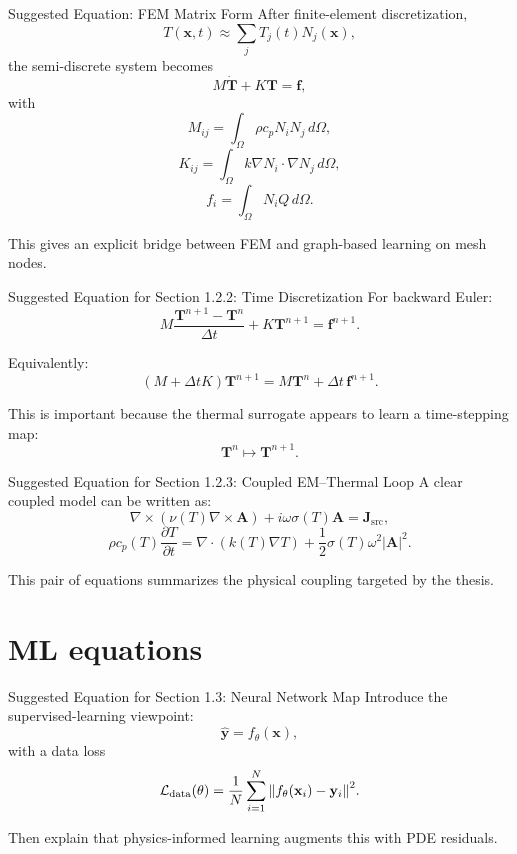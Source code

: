 \documentclass[aspectratio=169]{beamer}
\begin{document}
\begin{frame}{Suggested Equation: FEM Matrix Form}
After finite-element discretization,
\[
T(\mathbf{x},t)\approx \sum_j T_j(t)N_j(\mathbf{x}),
\]
the semi-discrete system becomes
\[
M \dot{\mathbf{T}} + K\mathbf{T}=\mathbf{f},
\]
with
\[
M_{ij}=\int_\Omega \rho c_p N_iN_j\,d\Omega,
\]
\[
K_{ij}=\int_\Omega k\nabla N_i\cdot\nabla N_j\,d\Omega,
\]
\[
f_i=\int_\Omega N_i Q\,d\Omega.
\]

This gives an explicit bridge between FEM and graph-based learning on mesh nodes.
\end{frame}

\begin{frame}{Suggested Equation for Section 1.2.2: Time Discretization}
For backward Euler:
\[
M\frac{\mathbf{T}^{n+1}-\mathbf{T}^{n}}{\Delta t}
+
K\mathbf{T}^{n+1}
=
\mathbf{f}^{n+1}.
\]

Equivalently:
\[
\left(M+\Delta t K\right)\mathbf{T}^{n+1}
=
M\mathbf{T}^{n}
+
\Delta t\,\mathbf{f}^{n+1}.
\]

This is important because the thermal surrogate appears to learn a time-stepping map:
\[
\mathbf{T}^{n}\mapsto \mathbf{T}^{n+1}.
\]
\end{frame}

\begin{frame}{Suggested Equation for Section 1.2.3: Coupled EM--Thermal Loop}
A clear coupled model can be written as:
\[
\nabla\times\left(\nu(T)\nabla\times \mathbf{A}\right)
+
i\omega\sigma(T)\mathbf{A}
=
\mathbf{J}_{\mathrm{src}},
\]
\[
\rho c_p(T)\frac{\partial T}{\partial t}
=
\nabla\cdot(k(T)\nabla T)
+
\frac{1}{2}\sigma(T)\omega^2|\mathbf{A}|^2.
\]

This pair of equations summarizes the physical coupling targeted by the thesis.
\end{frame}

\section{ML equations}

\begin{frame}{Suggested Equation for Section 1.3: Neural Network Map}
Introduce the supervised-learning viewpoint:
\[
\hat{\mathbf{y}} = f_\theta(\mathbf{x}),
\]
with a data loss
\[
\mathcal{L}_{\mathrm{data}}(\theta)
=
\frac{1}{N}\sum_{i=1}^N
\norm{f_\theta(\mathbf{x}_i)-\mathbf{y}_i}^2.
\]

Then explain that physics-informed learning augments this with PDE residuals.
\end{frame}
\end{document}
